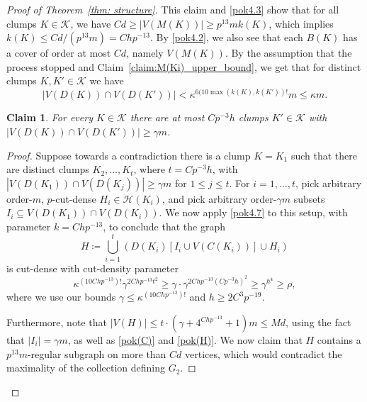 \documentclass[10pt]{article}
\newtheorem{claim}[theorem]{Claim}
\theoremstyle{definition}
\newcommand\ab[1]{\lvert#1\rvert}
\let\leq\leqslant
\let\geq\geqslant
\begin{document}
\begin{proof}[Proof of Theorem~\ref{thm: structure}]
This claim and \cref{pok4.3} show that for all clumps $K\in \mathcal K$, we have $Cd\geq |V(M(K))|\geq p^{13}mk(K)$, which implies  $k(K)\leq Cd/(p^{13}m)=Chp^{-13}$. By \cref{pok4.2}, we also see that each $B(K)$ has a cover of order at most $Cd$, namely $V(M(K))$.
 By the assumption that the process stopped and Claim~\ref{claim:M(Ki)_upper_bound}, we get that for distinct clumps $K, K'\in \mathcal K$ we have $$|V(D(K))\cap V(D(K'))|< \kappa^{6(10\max(k(K), k(K'))!} m\leq  \kappa m.$$  

\begin{claim}\label{claim:few big intersections}
    For every $K\in\mathcal K$ there are at most $Cp^{-3}h$ clumps $K'\in \mathcal K$ with $|V(D(K))\cap V(D(K'))|\geq \gamma m$.
\end{claim}
\begin{proof}
Suppose towards a contradiction there is a clump $K=K_1$ such that there are distinct clumps $K_2,\ldots,K_t$, where $t=Cp^{-3}h$, with $|V(D(K_1))\cap V(D(K_j))|\geq \gamma m$ for $1\leq j\leq t$. For $i=1, \dots, t$, pick arbitrary order-$m$, $p$-cut-dense $H_i\in \mathcal H(K_i)$, and pick arbitrary order-$\gamma m$ subsets $I_i\subseteq V(D(K_1))\cap V(D(K_i))$.
We now apply \cref{pok4.7} to this setup, with parameter $k=Chp^{-13}$, to conclude that the graph
\[
H \coloneqq \bigcup_{i=1}^t (D(K_i)[I_i \cup V(C(K_i))] \cup H_i)
\]
is cut-dense with cut-density parameter
\[
\kappa^{(10Chp^{-13})!}\gamma^{2Chp^{-13}t^2}\geq\gamma \cdot \gamma^{2Chp^{-13}(Cp^{-3}h)^2}\geq  \gamma^{h^4}\geq \rho,
\]
where we use our bounds $\gamma \leq \kappa^{(10Chp^{-13})!}$ and $h \geq 2C^3 p^{-19}$.

Furthermore, note that $|V(H)|\leq t\cdot (\gamma+4^{Chp^{-13}}+1)m\leq Md$, using the fact that $\ab{I_i}=\gamma m$, as well as \ref{pok(C)} and \ref{pok(H)}. 
We now claim that $H$ contains a $p^{13}m$-regular subgraph on more than $Cd$ vertices, which would contradict the maximality of the collection defining $G_2$.


\end{proof}
\end{proof}
\end{document}
